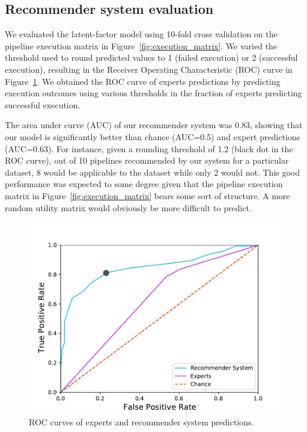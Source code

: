 \documentclass[conference]{IEEEtran}
\begin{document}

\subsection{Recommender system evaluation} 

We evaluated the latent-factor model using 10-fold cross validation on the
pipeline execution matrix in Figure~\ref{fig:execution_matrix}. We varied
the threshold used to round predicted values to 1 (failed execution) or 2
(successful execution), resulting in the Receiver Operating Characteristic
(ROC) curve  in Figure~\ref{fig:roc-curve}. We obtained the ROC curve of
experts predictions by predicting execution outcomes using various
thresholds in the fraction of experts predicting successful execution. 

The area under curve (AUC) of our recommender system was 0.83, showing that
our model is significantly better than chance (AUC=0.5) and expert
predictions (AUC=0.63). For instance, given a rounding threshold of 1.2
(black dot in the ROC curve), out of 10 pipelines
recommended by our system for a particular dataset, 8 would be applicable to
the dataset while only 2 would not. This good performance was expected to some degree given that the pipeline execution matrix in
Figure~\ref{fig:execution_matrix} bears some sort of structure. 
A more random utility matrix would obviously be more difficult to predict.

\begin{figure}
\centering
  \includegraphics[width=\columnwidth]{figures/ROC_Curve.pdf}
  \caption{ROC curves of experts and recommender system predictions.}
  \label{fig:roc-curve}
\end{figure}
\end{document}
